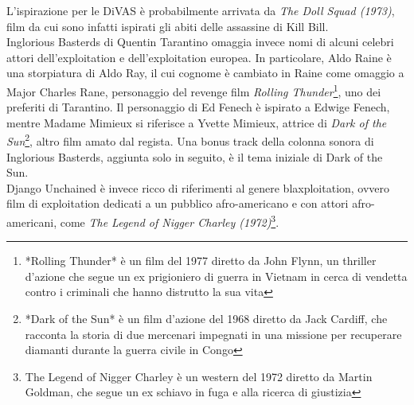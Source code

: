 \documentclass[12pt]{article} %
\begin{document}
\begin{flushleft}
    L'ispirazione per le DiVAS è probabilmente arrivata da \textit{The Doll Squad (1973)}, film da cui sono infatti ispirati gli abiti delle assassine di Kill Bill.\\\vspace{1cm}
    Inglorious Basterds di Quentin Tarantino omaggia invece nomi di alcuni celebri attori dell'exploitation e dell'exploitation europea. In particolare, Aldo Raine è una storpiatura di Aldo Ray, il cui cognome è cambiato in Raine come omaggio a Major Charles Rane, personaggio del revenge film \textit{Rolling Thunder}\footnote{*Rolling Thunder* è un film del 1977 diretto da John Flynn, un thriller d'azione che segue un ex prigioniero di guerra in Vietnam in cerca di vendetta contro i criminali che hanno distrutto la sua vita}, uno dei preferiti di Tarantino.
    Il personaggio di Ed Fenech è ispirato a Edwige Fenech, mentre Madame Mimieux si riferisce a Yvette Mimieux, attrice di \textit{Dark of the Sun}\footnote{*Dark of the Sun* è un film d'azione del 1968 diretto da Jack Cardiff, che racconta la storia di due mercenari impegnati in una missione per recuperare diamanti durante la guerra civile in Congo}, altro film amato dal regista. Una bonus track della colonna sonora di Inglorious Basterds, aggiunta solo in seguito, è il tema iniziale di Dark of the Sun.\\\vspace{1cm}
    Django Unchained è invece ricco di riferimenti al genere blaxploitation, ovvero film di exploitation dedicati a un pubblico afro-americano e con attori afro-americani, come \textit{The Legend of Nigger Charley (1972)}\footnote{The Legend of Nigger Charley è un western del 1972 diretto da Martin Goldman, che segue un ex schiavo in fuga e alla ricerca di giustizia}.
\end{flushleft}    
\end{document}
